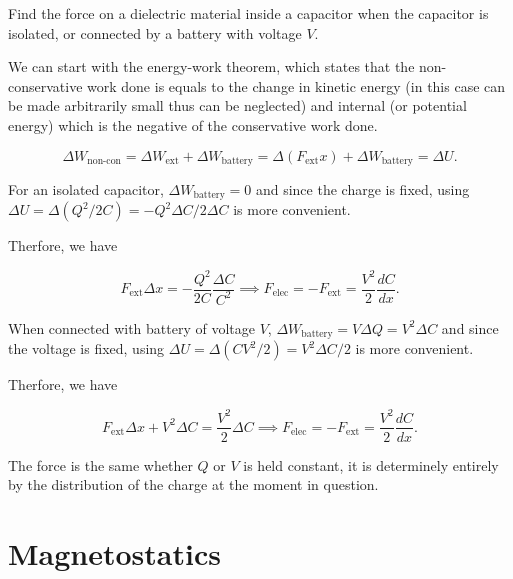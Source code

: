 \documentclass[english,a4paper,12pt]{report}
\begin{document}
{Find the force on a dielectric material inside a capacitor when the capacitor is isolated, or connected by a battery with voltage \(V\).}
{We can start with the energy-work theorem, which states that the non-conservative work done is equals to the change in kinetic energy (in this case can be made arbitrarily small thus can be neglected) and internal (or potential energy) which is the negative of the conservative work done.

\begin{equation}
    \Delta W_{\text{non-con} }  = \Delta W_{\text{ext} } + \Delta W_{\text{battery}} = \Delta \left( F_{\text{ext} } x \right) + \Delta W_{\text{battery} } = \Delta U.
\end{equation}

For an isolated capacitor, \(\Delta W_{\text{battery} } = 0 \) and since the charge is fixed, using \( \Delta U = \Delta \left( Q^2 /2C  \right) = - Q^2\Delta C / 2\Delta C  \) is more convenient. 

Therfore, we have

\begin{equation}
    F_{\text{ext} }\Delta x = -\frac{Q^2}{2C}\frac{\Delta C}{C^2} \implies F_{\text{elec} } = - F_{\text{ext} } = \frac{V^2}{2}\frac{dC}{dx}.    
\end{equation}

When connected with battery of voltage \(V\), \(\Delta W_{\text{battery} } = V \Delta Q = V^2\Delta C\) and since the voltage is fixed, using \(\Delta U = \Delta \left( CV^2/2 \right) = V^2\Delta C /2 \) is more convenient.

Therfore, we have

\begin{equation}
    F_{\text{ext} } \Delta x + V^2\Delta C = \frac{V^2}{2}\Delta C \implies F_{\text{elec} } = -F_{\text{ext} } = \frac{V^2}{2}\frac{dC}{dx}.
\end{equation}

The force is the same whether \(Q \text { or } V\) is held constant, it is determinely entirely by the distribution of the charge at the moment in question.  
} 

\chapter{Magnetostatics}
\end{document}
